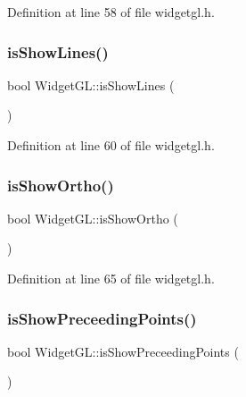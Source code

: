 Definition at line 58 of file widgetgl.\+h.

\mbox{\label{class_widget_g_l_a4b3db3eeec721cf96aa070e5ac086f7a}} 
\subsubsection{\texorpdfstring{isShowLines()}{isShowLines()}}
{\footnotesize\ttfamily bool Widget\+G\+L\+::is\+Show\+Lines (\begin{DoxyParamCaption}{ }\end{DoxyParamCaption})\hspace{0.3cm}{\ttfamily [inline]}}



Definition at line 60 of file widgetgl.\+h.

\mbox{\label{class_widget_g_l_a0c76a69e58a082c8c5175a6b788a6c2e}} 
\subsubsection{\texorpdfstring{isShowOrtho()}{isShowOrtho()}}
{\footnotesize\ttfamily bool Widget\+G\+L\+::is\+Show\+Ortho (\begin{DoxyParamCaption}{ }\end{DoxyParamCaption})\hspace{0.3cm}{\ttfamily [inline]}}



Definition at line 65 of file widgetgl.\+h.

\mbox{\label{class_widget_g_l_a07b1010cddc813fcf88b187f5d949098}} 
\subsubsection{\texorpdfstring{isShowPreceedingPoints()}{isShowPreceedingPoints()}}
{\footnotesize\ttfamily bool Widget\+G\+L\+::is\+Show\+Preceeding\+Points (\begin{DoxyParamCaption}{ }\end{DoxyParamCaption})\hspace{0.3cm}{\ttfamily [inline]}}



